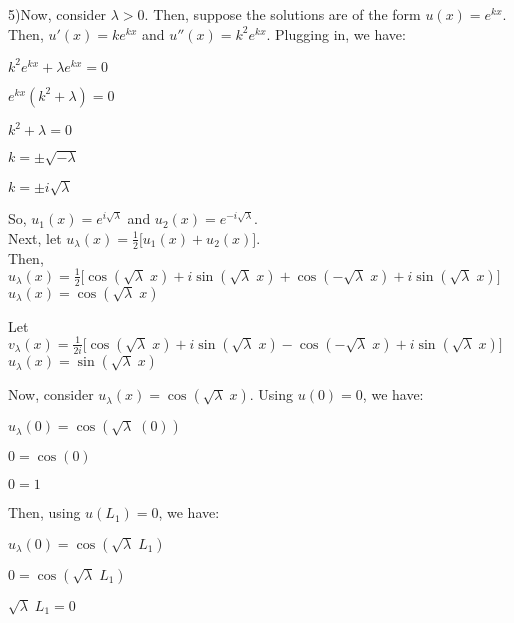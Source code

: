 \documentclass[12pt, executivepaper]{article}
\begin{document}
\begin{flushleft}

5)Now, consider $\lambda > 0$. Then, suppose the solutions are of the form $u(x)=e^{kx}$. Then, $u'(x)=ke^{kx}$ and $u''(x)=k^2e^{kx}$. Plugging in, we have: 

\begin{center}

$k^2e^{kx}+ \lambda e^{kx}=0$

$e^{kx}(k^2+ \lambda)=0$

$k^2+ \lambda=0$

$k=\pm \sqrt{-\lambda}$

$k=\pm i \sqrt{\lambda}$

\end{center}

So, $u_{1}(x)=e^{i \sqrt{\lambda}}$ and $u_{2}(x)=e^{-i \sqrt{\lambda}}$. \\

Next, let $u_{\lambda}(x)=\frac{1}{2}\bigg[u_{1}(x)+u_{2}(x)\bigg]$. \\

Then, \\ 
$u_{\lambda}(x)=\frac{1}{2}\bigg[\cos(\sqrt{\lambda} \; x)+i\sin(\sqrt{\lambda} \; x)+\cos(-\sqrt{\lambda} \; x)+i\sin(\sqrt{\lambda} \; x)\bigg]$ \\

$u_{\lambda}(x)=\cos(\sqrt{\lambda} \; x)$

\vspace{3mm}

Let $v_{\lambda}(x)=\frac{1}{2i}\bigg[\cos(\sqrt{\lambda} \; x)+i\sin(\sqrt{\lambda} \; x)-\cos(-\sqrt{\lambda} \; x)+i\sin(\sqrt{\lambda} \; x)\bigg]$ \\

$u_{\lambda}(x)=\sin(\sqrt{\lambda} \; x)$

\vspace{3mm}

Now, consider $u_{\lambda}(x)=\cos(\sqrt{\lambda} \; x)$. Using $u(0)=0$, we have:

\begin{center}

$u_{\lambda}(0)=\cos(\sqrt{\lambda} \; (0))$

$0=\cos(0)$

$0=1$

\end{center}

\vspace{3mm}

Then, using $u(L_{1})=0$, we have: 

\begin{center}

$u_{\lambda}(0)=\cos(\sqrt{\lambda} \; L_{1})$

$0=\cos(\sqrt{\lambda} \; L_{1})$

$\sqrt{\lambda} \; L_{1}=0$

\end{center}

\end{flushleft}
\end{document}
